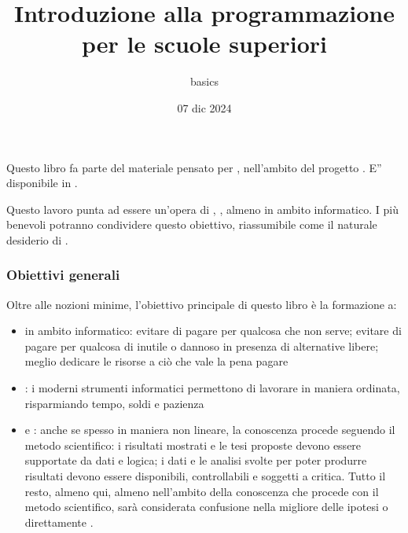 \documentclass[letterpaper,10pt,italian]{jupyterBook}
\title{Introduzione alla programmazione per le scuole superiori}
\date{07 dic 2024}
\author{basics}
\begin{document}
\pagestyle{empty}
\sphinxmaketitle
\pagestyle{plain}
\sphinxtableofcontents
\pagestyle{normal}
\label{\detokenize{intro::doc}}


\sphinxAtStartPar
Questo libro fa parte del materiale pensato per , nell’ambito del progetto . E” disponibile in .

\sphinxAtStartPar
{} Questo lavoro punta ad essere un’opera di  ,   , almeno in ambito informatico. I più benevoli potranno condividere questo obiettivo, riassumibile come il naturale desiderio di .
\subsubsection*{Obiettivi generali}

\sphinxAtStartPar
Oltre alle nozioni minime, l’obiettivo principale di questo libro è la formazione a:
\begin{itemize}
\item {} 
\sphinxAtStartPar
{} in ambito informatico: evitare di pagare per qualcosa che non serve; evitare di pagare per qualcosa di inutile o dannoso in presenza di alternative libere; meglio dedicare le risorse a ciò che vale la pena pagare

\item {} 
\sphinxAtStartPar
{}: i moderni strumenti informatici permettono di lavorare in maniera ordinata, risparmiando tempo, soldi e pazienza

\item {} 
\sphinxAtStartPar
{} e : anche se spesso in maniera non lineare, la conoscenza procede seguendo il metodo scientifico: i risultati mostrati e le tesi proposte devono essere supportate da dati e logica; i dati e le analisi svolte per poter produrre risultati devono essere disponibili, controllabili e soggetti a critica. Tutto il resto, almeno qui, almeno nell’ambito della conoscenza che procede con il metodo scientifico, sarà considerata confusione nella migliore delle ipotesi o direttamente .

\end{itemize}
\end{document}
